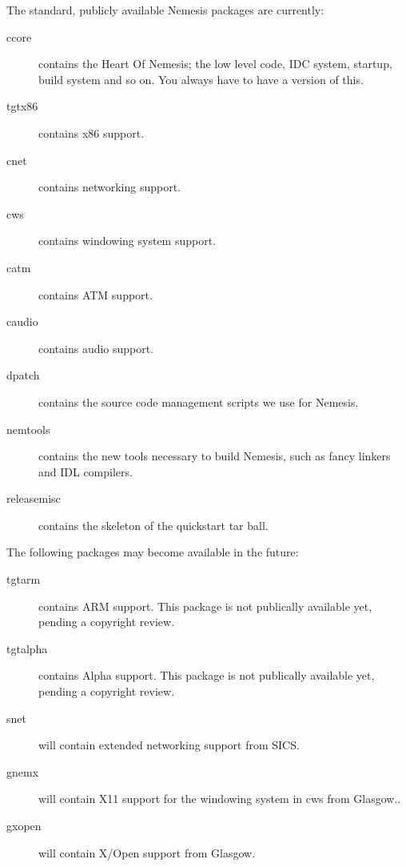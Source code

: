 \documentclass[a4paper]{article}
\begin{document}
The standard, publicly available Nemesis packages are currently:

\begin{description}
\item[ccore] contains the Heart Of Nemesis; the low level code, IDC
system, startup, build system and so on. You always have to have a
version of this. 

\item[tgtx86] contains x86 support. 

\item[cnet] contains networking support. 

\item[cws] contains windowing system support. 

\item[catm] contains ATM support. 

\item[caudio] contains audio support. 

\item[dpatch] contains the source code management scripts we use for
Nemesis.

\item[nemtools] contains the new tools necessary to build Nemesis,
such as fancy linkers and IDL compilers.

\item[releasemisc] contains the skeleton of the quickstart tar ball.

\end{description}

The following packages may become available in the future:

\begin{description}
\item[tgtarm] contains ARM support. This package is not publically
available yet, pending a copyright review.

\item[tgtalpha] contains Alpha support. This package is not publically
available yet, pending a copyright review.

\item[snet] will contain extended networking support from SICS.

\item[gnemx] will contain X11 support for the windowing system in cws
from Glasgow..

\item[gxopen] will contain X/Open support from Glasgow.

\end{description}
\end{document}
